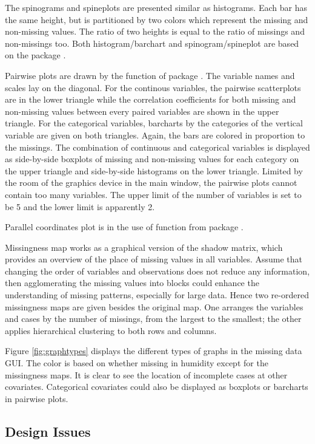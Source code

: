 \documentclass[article]{jss}
\begin{document}
The spinograms and spineplots are presented similar as histograms. Each bar has the same height, but is partitioned by two colors which represent the missing and non-missing values. The ratio of two heights is equal to the ratio of missings and non-missings too. Both histogram/barchart and spinogram/spineplot are based on the package  \citep{ggplot2}.

Pairwise plots are drawn by the function  of package  \citep{ggally}. The variable names and scales lay on the diagonal. For the continous variables, the pairwise scatterplots are in the lower triangle while the correlation coefficients for both missing and non-missing values between every paired variables are shown in the upper triangle. For the categorical variables, barcharts by the categories of the vertical variable are given on both triangles. Again, the bars are colored in proportion to the missings. The combination of continuous and categorical variables is displayed as side-by-side boxplots of missing and non-missing values for each category on the upper triangle and side-by-side histograms on the lower triangle. Limited by the room of the graphics device in the main window, the pairwise plots cannot contain too many variables. The upper limit of the number of variables is set to be 5 and the lower limit is apparently 2.

Parallel coordinates plot is in the use of function  from package  \citep{ggplot2}.

Missingness map works as a graphical version of the shadow matrix, which provides an overview of the place of missing values in all variables. Assume that changing the order of variables and observations does not reduce any information, then agglomerating the missing values into blocks could enhance the understanding of missing patterns, especially for large data. Hence two re-ordered missingness maps are given besides the original map. One arranges the variables and cases by the number of missings, from the largest to the smallest; the other applies hierarchical clustering to both rows and columns.

Figure \ref{fig:graphtypes} displays the different types of graphs in the missing data GUI. The color is based on whether missing in humidity except for the missingness maps. It is clear to see the location of incomplete cases at other covariates. Categorical covariates could also be displayed as boxplots or barcharts in pairwise plots. 

\subsection{Design Issues}
\end{document}
